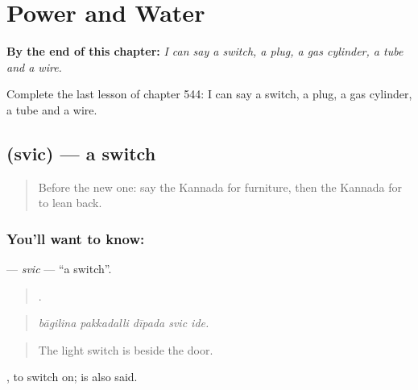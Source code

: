 
\chapter{Power and Water}
\label{ch:ka-power-and-water}

\begin{chapteropening}
\textbf{By the end of this chapter:} \emph{I can say a switch, a plug, a gas cylinder, a tube and a wire.}

Complete the last lesson of chapter 544: I can say a switch, a plug, a gas cylinder, a tube and a wire.
\end{chapteropening}

\section[\texorpdfstring{\kn{ಸ್ವಿಚ್} (svic)}{ಸ್ವಿಚ್ (svic)}]{ (svic) — a switch}

\label{lesson:KA-C544-svic}



\begin{quote}
Before the new one: say the Kannada for furniture, then the Kannada for to lean back.
\end{quote}

\subsection*{You'll want to know: }
\textbf{} — \emph{svic} — \textquotedblleft{}a switch\textquotedblright{}.

\begin{quote}
    .
\end{quote}

\begin{quote}
\emph{bāgilina pakkadalli dīpada svic ide.}
\end{quote}

\begin{quote}
The light switch is beside the door.
\end{quote}

 , to switch on;   is also said.

